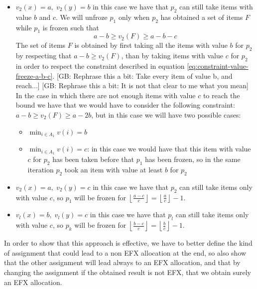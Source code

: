 \documentclass{article}
\newcommand{\gb}[1]{{\color{red}[GB: #1]}}
\begin{document}
\begin{itemize}
    \item $v_2(x) = a,\; v_2(y) =  b$ in this case we have that $p_2$ can still take items with value $b$ and $c$. We will unfroze $p_1$ only when $p_2$ has obtained a set of items $F$ while $p_1$ is frozen such that
    \begin{equation}
        a-b\ge v_2(F)\ge a-b-c
        \label{eq:constraint-value-freeze-a-b-c}
    \end{equation}
    The set of items $F$ is obtained by first taking all the items with value $b$ for $p_2$ by respecting that $a-b\ge v_2(F)$, than by taking items with value $c$ for $p_2$ in order to respect the constraint described in equation \ref{eq:constraint-value-freeze-a-b-c}.
    \gb{Rephrase this a bit: Take every item of value b, and reach...}
    \gb{Rephrase this a bit: It is not that clear to me what you mean}
    In the case in which there are not enough items with value $c$ to reach the bound we have that we would have to consider the following constraint: $ a-b\ge v_2(F)\ge a-2b$, but in this case we will have two possible cases:
    \begin{itemize}
        \item $\min_{i\in A_1} v(i) = b$ 
        \item $\min_{i\in A_1} v(i) = c$: in this case we would have that this item with value $c$ for $p_2$ has been taken before that $p_1$ has been frozen, so in the same iteration $p_2$ took an item with value at least $b$ for $p_2$
    \end{itemize}
    \item $v_2(x) = a,\; v_2(y) =  c$ in this case we have that $p_2$ can still take items only with value $c$, so $p_1$ will be frozen for $\left\lfloor \frac{a-c}{c}\right \rfloor =\left \lfloor \frac{a}{c}\right \rfloor - 1$.
    \item $v_l(x) = b,\; v_l(y) =  c$ in this case we have that $p_l$ can still take items only with value $c$, so $p_k$ will be frozen for $\left \lfloor \frac{b-c}{c}\right \rfloor =\left  \lfloor \frac{b}{c}\right \rfloor - 1$.
\end{itemize}
In order to show that this approach is effective, we have to better define the kind of assignment that could lead to a non EFX allocation at the end, so also show that the other assignment will lead always to an EFX allocation, and that by changing the assignment if the obtained result is not EFX, that we obtain surely an EFX allocation.
\end{document}

